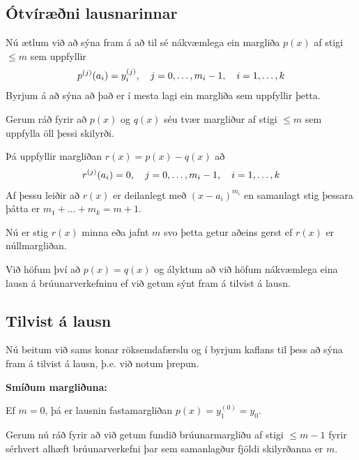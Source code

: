 \documentclass[A4paper,10pt,icelandic]{sphinxmanual}
\begin{document}
\subsection{Ótvíræðni lausnarinnar}
\label{kafli03:otviraeni-lausnarinnar}
Nú ætlum við að sýna fram á að til sé nákvæmlega ein margliða
\(p(x)\) af stigi \(\leq m\) sem uppfyllir
\begin{gather}
\begin{split}p^{(j)}(a_i) = y_i^{(j)},
  \quad j = 0, \ldots, m_i-1, \quad i = 1, \ldots, k\end{split}\notag
\end{gather}
Byrjum á að sýna að það er í mesta lagi ein margliða sem uppfyllir þetta.

Gerum ráð fyrir að
\(p(x)\) og \(q(x)\) séu tvær margliður af stigi \(\leq m\)
sem uppfylla öll þessi skilyrði.

Þá uppfyllir margliðan \(r(x) = p(x) - q(x)\) að
\begin{gather}
\begin{split}r^{(j)}(a_i) = 0, \quad j = 0, \ldots, m_i-1,
  \quad i = 1, \ldots,k\end{split}\notag
\end{gather}
Af þessu leiðir að \(r(x)\) er deilanlegt með \((x-a_i)^{m_i}\)
en samanlagt stig þessara þátta er \(m_1 + \ldots + m_k = m + 1\).

Nú er stig \(r(x)\) minna eða jafnt \(m\) svo þetta getur aðeins
gerst ef \(r(x)\) er núllmargliðan.

Við höfum því að \(p(x) = q(x)\) og ályktum að við höfum nákvæmlega
eina lausn á brúunarverkefninu ef við getum sýnt fram á tilvist á lausn.


\subsection{Tilvist á lausn}
\label{kafli03:tilvist-a-lausn}
Nú beitum við sams konar röksemdafærslu og í byrjum kaflans til þess að sýna
fram á tilvist á lausn, þ.e. við notum þrepun.

\textbf{Smíðum margliðuna:}

Ef \(m = 0\), þá er lausnin fastamargliðan
\(p(x) = y_1^{(0)}=y_0\).

Gerum nú ráð fyrir að við getum fundið brúunarmargliðu af stigi
\(\leq m-1\) fyrir sérhvert alhæft brúunarverkefni þar sem
samanlagður fjöldi skilyrðanna er \(m\).
\end{document}
